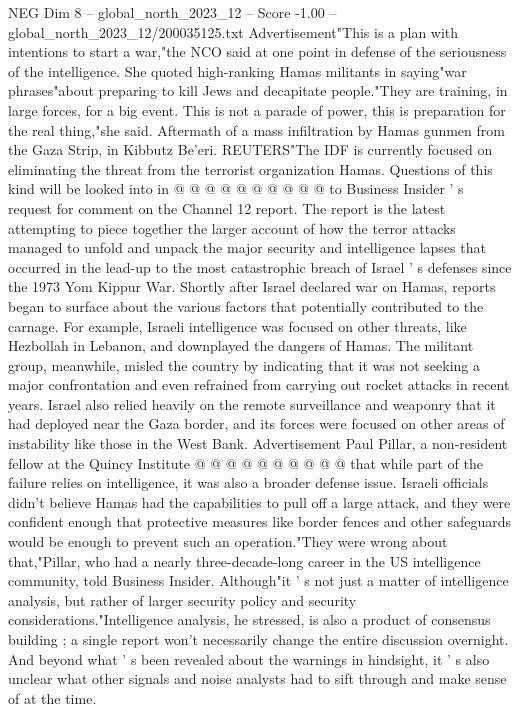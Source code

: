 \begin{textsample}{NEG Dim 8 – global\_north\_2023\_12 – Score -1.00 – global\_north\_2023\_12/200035125.txt}
Advertisement"This is a plan with intentions to start a war,"the NCO said at one point in defense of the seriousness of the intelligence.
She quoted high-ranking Hamas militants in saying"war phrases"about preparing to kill Jews and decapitate people."They are training, in large forces, for a big event.
This is not a parade of power, this is preparation for the real thing,"she said.
Aftermath of a mass infiltration by Hamas gunmen from the Gaza Strip, in Kibbutz Be'eri.
REUTERS"The IDF is currently focused on eliminating the threat from the terrorist organization Hamas.
Questions of this kind will be looked into in @ @ @ @ @ @ @ @ @ @ to Business Insider ' s request for comment on the Channel 12 report.
The report is the latest attempting to piece together the larger account of how the terror attacks managed to unfold and unpack the major security and intelligence lapses that occurred in the lead-up to the most catastrophic breach of Israel ' s defenses since the 1973 Yom Kippur War.
Shortly after Israel declared war on Hamas, reports began to surface about the various factors that potentially contributed to the carnage.
For example, Israeli intelligence was focused on other threats, like Hezbollah in Lebanon, and downplayed the dangers of Hamas.
The militant group, meanwhile, misled the country by indicating that it was not seeking a major confrontation and even refrained from carrying out rocket attacks in recent years.
Israel also relied heavily on the remote surveillance and weaponry that it had deployed near the Gaza border, and its forces were focused on other areas of instability like those in the West Bank.
Advertisement Paul Pillar, a non-resident fellow at the Quincy Institute @ @ @ @ @ @ @ @ @ @ that while part of the failure relies on intelligence, it was also a broader defense issue.
Israeli officials didn't believe Hamas had the capabilities to pull off a large attack, and they were confident enough that protective measures like border fences and other safeguards would be enough to prevent such an operation."They were wrong about that,"Pillar, who had a nearly three-decade-long career in the US intelligence community, told Business Insider.
Although"it ' s not just a matter of intelligence analysis, but rather of larger security policy and security considerations."Intelligence analysis, he stressed, is also a product of consensus building ; a single report won't necessarily change the entire discussion overnight.
And beyond what ' s been revealed about the warnings in hindsight, it ' s also unclear what other signals and noise analysts had to sift through and make sense of at the time.

\end{textsample}
